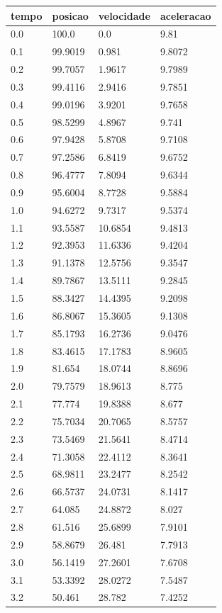 \begin{tabular}{llll}
\toprule
tempo & posicao & velocidade & aceleracao \\
\midrule
0.0 & 100.0 & 0.0 & 9.81 \\
0.1 & 99.9019 & 0.981 & 9.8072 \\
0.2 & 99.7057 & 1.9617 & 9.7989 \\
0.3 & 99.4116 & 2.9416 & 9.7851 \\
0.4 & 99.0196 & 3.9201 & 9.7658 \\
0.5 & 98.5299 & 4.8967 & 9.741 \\
0.6 & 97.9428 & 5.8708 & 9.7108 \\
0.7 & 97.2586 & 6.8419 & 9.6752 \\
0.8 & 96.4777 & 7.8094 & 9.6344 \\
0.9 & 95.6004 & 8.7728 & 9.5884 \\
1.0 & 94.6272 & 9.7317 & 9.5374 \\
1.1 & 93.5587 & 10.6854 & 9.4813 \\
1.2 & 92.3953 & 11.6336 & 9.4204 \\
1.3 & 91.1378 & 12.5756 & 9.3547 \\
1.4 & 89.7867 & 13.5111 & 9.2845 \\
1.5 & 88.3427 & 14.4395 & 9.2098 \\
1.6 & 86.8067 & 15.3605 & 9.1308 \\
1.7 & 85.1793 & 16.2736 & 9.0476 \\
1.8 & 83.4615 & 17.1783 & 8.9605 \\
1.9 & 81.654 & 18.0744 & 8.8696 \\
2.0 & 79.7579 & 18.9613 & 8.775 \\
2.1 & 77.774 & 19.8388 & 8.677 \\
2.2 & 75.7034 & 20.7065 & 8.5757 \\
2.3 & 73.5469 & 21.5641 & 8.4714 \\
2.4 & 71.3058 & 22.4112 & 8.3641 \\
2.5 & 68.9811 & 23.2477 & 8.2542 \\
2.6 & 66.5737 & 24.0731 & 8.1417 \\
2.7 & 64.085 & 24.8872 & 8.027 \\
2.8 & 61.516 & 25.6899 & 7.9101 \\
2.9 & 58.8679 & 26.481 & 7.7913 \\
3.0 & 56.1419 & 27.2601 & 7.6708 \\
3.1 & 53.3392 & 28.0272 & 7.5487 \\
3.2 & 50.461 & 28.782 & 7.4252 \\

\end{tabular}
